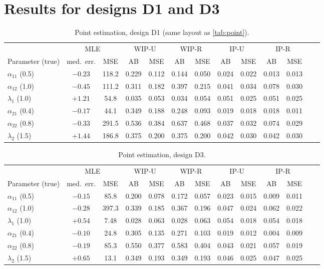 \documentclass[a4paper,11pt]{article}
\begin{document}
\section{Results for designs D1 and D3}
\begin{table}[htbp]
\centering\small\setlength{\tabcolsep}{4pt}
\caption{Point estimation, design D1 (same layout as \cref{tab:point}).}
\begin{tabular}{lcccccccccccc}
\hline
 & \multicolumn{2}{c}{MLE} & \multicolumn{2}{c}{WIP-U} & \multicolumn{2}{c}{WIP-R} & \multicolumn{2}{c}{IP-U} & \multicolumn{2}{c}{IP-R}\\
Parameter (true) & med.\ err. & MSE & AB & MSE & AB & MSE & AB & MSE & AB & MSE\\\hline
$\alpha_{11}$ (0.5) & $-0.23$ & 118.2 & 0.229 & 0.112 & 0.144 & 0.050 & 0.024 & 0.022 & 0.013 & 0.013\\
$\alpha_{12}$ (1.0) & $-0.45$ & 111.2 & 0.311 & 0.182 & 0.397 & 0.215 & 0.041 & 0.034 & 0.078 & 0.030\\
$\lambda_1$ (1.0) & $+1.21$ & 54.8 & 0.035 & 0.053 & 0.034 & 0.054 & 0.051 & 0.025 & 0.051 & 0.025\\
$\alpha_{21}$ (0.4) & $-0.17$ & 44.1 & 0.349 & 0.188 & 0.248 & 0.093 & 0.019 & 0.018 & 0.018 & 0.011\\
$\alpha_{22}$ (0.8) & $-0.33$ & 291.5 & 0.536 & 0.384 & 0.637 & 0.468 & 0.037 & 0.032 & 0.074 & 0.029\\
$\lambda_2$ (1.5) & $+1.44$ & 186.8 & 0.375 & 0.200 & 0.375 & 0.200 & 0.042 & 0.030 & 0.042 & 0.030\\\hline
\end{tabular}
\end{table}
\begin{table}[htbp]
\centering\small\setlength{\tabcolsep}{4pt}
\caption{Point estimation, design D3.}
\begin{tabular}{lcccccccccccc}
\hline
 & \multicolumn{2}{c}{MLE} & \multicolumn{2}{c}{WIP-U} & \multicolumn{2}{c}{WIP-R} & \multicolumn{2}{c}{IP-U} & \multicolumn{2}{c}{IP-R}\\
Parameter (true) & med.\ err. & MSE & AB & MSE & AB & MSE & AB & MSE & AB & MSE\\\hline
$\alpha_{11}$ (0.5) & $-0.15$ & 85.8 & 0.200 & 0.078 & 0.172 & 0.057 & 0.023 & 0.015 & 0.009 & 0.011\\
$\alpha_{12}$ (1.0) & $-0.28$ & 397.3 & 0.339 & 0.185 & 0.367 & 0.196 & 0.047 & 0.024 & 0.062 & 0.022\\
$\lambda_1$ (1.0) & $+0.54$ & 7.48 & 0.028 & 0.063 & 0.028 & 0.063 & 0.054 & 0.018 & 0.054 & 0.018\\
$\alpha_{21}$ (0.4) & $-0.10$ & 24.8 & 0.305 & 0.135 & 0.271 & 0.103 & 0.019 & 0.012 & 0.004 & 0.009\\
$\alpha_{22}$ (0.8) & $-0.19$ & 85.3 & 0.550 & 0.377 & 0.583 & 0.404 & 0.043 & 0.021 & 0.057 & 0.019\\
$\lambda_2$ (1.5) & $+0.65$ & 13.1 & 0.349 & 0.193 & 0.349 & 0.193 & 0.046 & 0.025 & 0.047 & 0.025\\\hline
\end{tabular}
\end{table}



\end{document}
